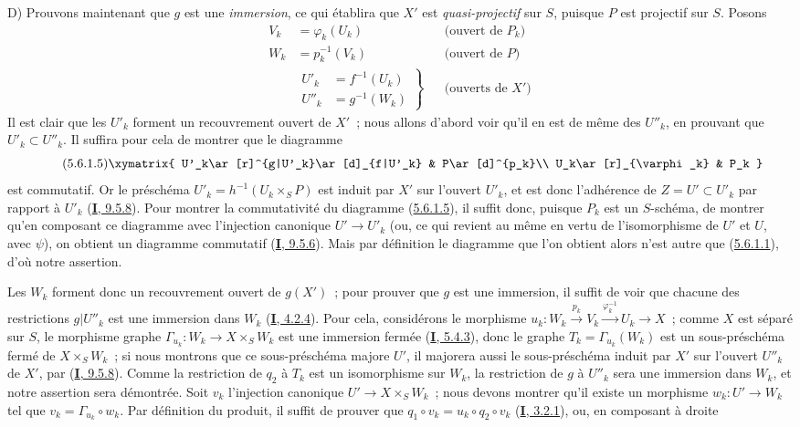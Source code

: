 D) Prouvons maintenant que $g$ est une \emph{immersion}, ce qui établira que $X'$ est
\emph{quasi-projectif} sur $S$, puisque $P$ est projectif sur $S$. Posons
\begin{align*}
V_k&=\varphi_k(U_k) &&\text{(ouvert de $P_k$)}\\
W_k&=p_k^{-1}(V_k) &&\text{(ouvert de $P$)}\\
&\left.\begin{aligned}U'_k&=f^{-1}(U_k)\\U''_k&=g^{-1}(W_k)\end{aligned}\right\}
&&\text{(ouverts de $X'$)}
\end{align*}
Il est clair que les $U'_k$ forment un recouvrement ouvert de $X'$~; nous
allons d'abord voir qu'il en est de même des $U''_k$, en prouvant que
$U'_k\subset U''_k$. Il suffira pour cela de montrer que le diagramme
\[
\tag{5.6.1.5}
\label{II.5.6.1.5-fr}
\xymatrix{
U'_k\ar[r]^{g|U'_k}\ar[d]_{f|U'_k} & P\ar[d]^{p_k}\\
U_k\ar[r]_{\varphi_k} & P_k
}
\]
est commutatif. Or le préschéma $U'_k=h^{-1}(U_k\times_SP)$ est induit par
$X'$ sur l'ouvert $U'_k$, et est donc l'adhérence de $Z=U'\subset U'_k$ par
rapport à $U'_k$ (\hyperref[I.9.5.8-fr]{\textbf{I}, 9.5.8}). Pour montrer la
commutativité du diagramme (\hyperref[II.5.6.1.5-fr]{5.6.1.5}), il suffit
donc, puisque $P_k$ est un $S$-schéma, de montrer qu'en composant ce diagramme
avec l'injection canonique $U'\to U'_k$ (ou, ce qui revient au même en vertu de
l'isomorphisme de $U'$ et $U$, avec $\psi$), on obtient un diagramme commutatif
(\hyperref[I.9.5.6-fr]{\textbf{I}, 9.5.6}). Mais par définition le diagramme que l'on
obtient alors n'est autre que (\hyperref[II.5.6.1.1-fr]{5.6.1.1}), d'où notre
assertion.

Les $W_k$ forment donc un recouvrement ouvert de $g(X')$~; pour prouver que
$g$ est une immersion, il suffit de voir que chacune des restrictions
$g|U''_k$ est une immersion dans $W_k$
(\hyperref[I.4.2.4-fr]{\textbf{I}, 4.2.4}). Pour cela, considérons le morphisme
$u_k:W_k\xrightarrow{p_k}V_k\xrightarrow{\varphi_k^{-1}}U_k\to X$~; comme
$X$ est séparé sur $S$, le morphisme graphe
$\Gamma_{u_k}:W_k\to X\times_SW_k$ est une immersion fermée
(\hyperref[I.5.4.3-fr]{\textbf{I}, 5.4.3}), donc le graphe
$T_k=\Gamma_{u_k}(W_k)$ est un sous-préschéma fermé de $X\times_SW_k$~; si
nous montrons que ce sous-préschéma majore $U'$, il majorera aussi le
sous-préschéma induit par $X'$ sur l'ouvert $U''_k$ de $X'$, par
(\hyperref[I.9.5.8-fr]{\textbf{I}, 9.5.8}). Comme la restriction de $q_2$ à $T_k$ est
un isomorphisme sur $W_k$, la restriction de $g$ à $U''_k$ sera une immersion
dans $W_k$, et notre assertion sera démontrée. Soit $v_k$ l'injection
canonique $U'\to X\times_SW_k$~; nous devons montrer qu'il existe un morphisme
$w_k:U'\to W_k$ tel que $v_k=\Gamma_{u_k}\circ w_k$. Par définition du
produit, il suffit de prouver que
$q_1\circ v_k=u_k\circ q_2\circ v_k$
(\hyperref[I.3.2.1-fr]{\textbf{I}, 3.2.1}), ou, en composant à droite

